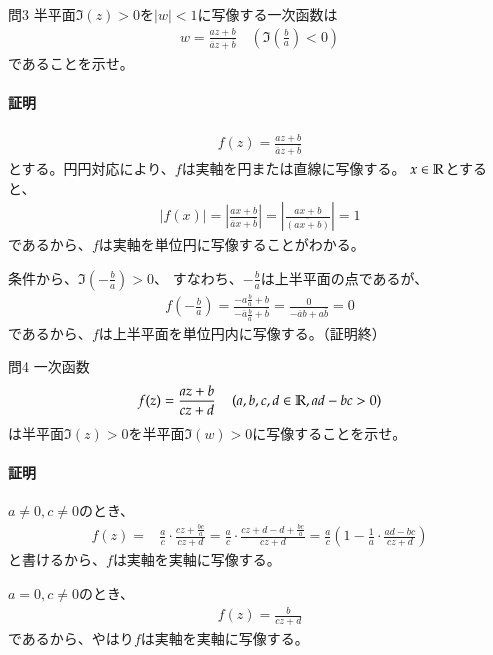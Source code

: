 \newpage
\begin{mysimplebox}{問3}
    半平面$\Im(z)>0$を$|w|<1$に写像する一次函数は
    \begin{align*}
        w=\frac{az+b}{\overline{a}z+\overline{b}}
        \quad\left(\Im\left(\frac{b}{a}\right)<0\right)
    \end{align*}
    であることを示せ。
\end{mysimplebox}
\paragraph{証明}
\begin{align*}
    f(z)=\frac{az+b}{\overline{a}z+\overline{b}}
\end{align*}
とする。円円対応により、$f$は実軸を円または直線に写像する。
$x\in\mathbb{R}$とすると、
\begin{align*}
    \left|f(x)\right|
    =\left|\frac{ax+b}{\overline{a}x+\overline{b}}\right|
    =\left|\frac{ax+b}{\overline{(ax+b)}}\right|
    =1
\end{align*}
であるから、$f$は実軸を単位円に写像することがわかる。

条件から、$\Im\left(-\frac{b}{a}\right)>0$、
すなわち、$-\frac{b}{a}$は上半平面の点であるが、
\begin{align*}
    f\left(-\frac{b}{a}\right)
    =\frac{-a\frac{b}{a}+b}{-\overline{a}\frac{b}{a}+\overline{b}}
    =\frac{0}{-\overline{a}b+a\overline{b}}
    =0
\end{align*}
であるから、$f$は上半平面を単位円内に写像する。（証明終）

\newpage
\begin{mysimplebox}{問4}
    一次函数
    \begin{align*}
        f(z)=\frac{az+b}{cz+d}
        \quad\left(a,b,c,d\in\mathbb{R},ad-bc>0\right)
    \end{align*}
    は半平面$\Im(z)>0$を半平面$\Im(w)>0$に写像することを示せ。
\end{mysimplebox}
\paragraph{証明}
$a\neq0,c\neq0$のとき、
\begin{align*}
    f(z)=&\frac{a}{c}\cdot\frac{cz+\frac{bc}{a}}{cz+d}
    =\frac{a}{c}\cdot\frac{cz+d-d+\frac{bc}{a}}{cz+d}
    =\frac{a}{c}\left(1-\frac{1}{a}\cdot\frac{ad-bc}{cz+d}\right)
\end{align*}
と書けるから、$f$は実軸を実軸に写像する。

$a=0,c\neq0$のとき、
\begin{align*}
    f(z)=\frac{b}{cz+d}
\end{align*}
であるから、やはり$f$は実軸を実軸に写像する。


